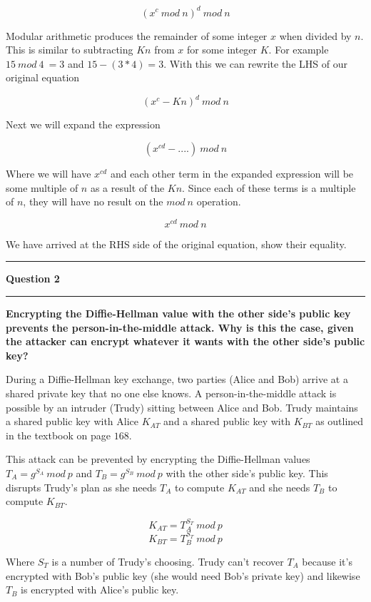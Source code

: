 \documentclass[11pt]{article}
\newcommand\question[2]{\vspace{.25in}\hrule\textbf{#1}\vspace{.5em}\hrule\vspace{.10in}}
\renewcommand\part[1]{\vspace{.10in}\textbf{(#1)}}
\begin{document}
$$(x^c \ mod \ n)^d \ mod \ n$$

Modular arithmetic produces the remainder of some integer $x$ when divided by $n$. This is similar to subtracting $Kn$ from $x$ for some integer $K$. For example $15 \ mod \ 4 \ = 3$ and $15 - (3 * 4) = 3$. With this we can rewrite the LHS of our original equation

$$(x^c - Kn)^d \ mod \ n$$

Next we will expand the expression

$$(x^{cd} - ....) \ mod \ n$$

Where we will have $x^{cd}$ and each other term in the expanded expression will be some multiple of $n$ as a result of the $Kn$. Since each of these terms is a multiple of $n$, they will have no result on the $mod \ n$ operation.

$$x^{cd} \ mod \ n$$

We have arrived at the RHS side of the original equation, show their equality.


\question{Question 2}

\part{a} \textbf{Encrypting the Diffie-Hellman value with the other side's public key prevents the person-in-the-middle attack. Why is this the case, given the attacker can encrypt whatever it wants with the other side's public key?}

During a Diffie-Hellman key exchange, two parties (Alice and Bob) arrive at a shared private key that no one else knows. A person-in-the-middle attack is possible by an intruder (Trudy) sitting between Alice and Bob. Trudy maintains a shared public key with Alice $K_{AT}$ and a shared public key with $K_{BT}$ as outlined in the textbook on page $168$.

This attack can be prevented by encrypting the Diffie-Hellman values $T_A = g^{S_A} \ mod \ p$ and $T_B = g^{S_B} \ mod \ p$ with the other side's public key. This disrupts Trudy's plan as she needs $T_A$ to compute $K_{AT}$ and she needs $T_B$ to compute $K_{BT}$.

$$K_{AT} = T_A^{S_T} \ mod \ p$$
$$K_{BT} = T_B^{S_T} \ mod \ p$$

Where $S_T$ is a number of Trudy's choosing. Trudy can't recover $T_A$ because it's encrypted with Bob's public key (she would need Bob's private key) and likewise $T_B$ is encrypted with Alice's public key.
\end{document}
